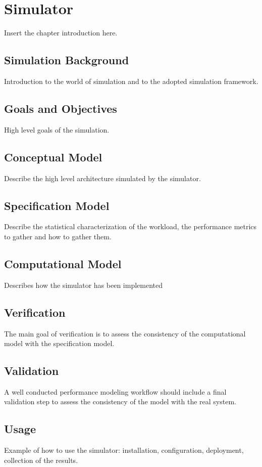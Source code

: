 \chapter{Simulator}
\label{chp:simulator}


Insert the chapter introduction here.


\section{Simulation Background}
\label{sec:simulation-background}
Introduction to the world of simulation and to the adopted simulation framework.


\section{Goals and Objectives}
\label{sec:goals-and-objectives}
High level goals of the simulation.


\section{Conceptual Model}
\label{sec:conceptual-model}
Describe the high level architecture simulated by the simulator.


\section{Specification Model}
\label{sec:specification-model}
Describe the statistical characterization of the workload, the performance metrics to gather and how to gather them.


\section{Computational Model}
\label{sec:computational-model}
Describes how the simulator has been implemented


\section{Verification}
\label{sec:verification}
The main goal of verification is to assess the consistency of the computational model with the specification model. 


\section{Validation}
\label{sec:validation}
A well conducted performance modeling workflow should include a final validation step to assess the consistency of the model with the real system. 


\section{Usage}
\label{sec:usage}
Example of how to use the simulator: installation, configuration, deployment, collection of the results.